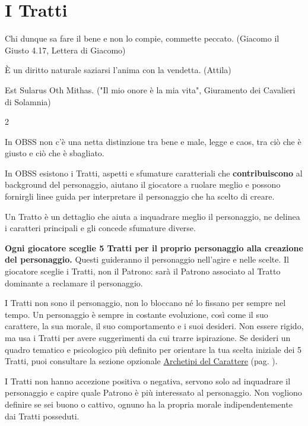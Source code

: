\section{I Tratti}\hypertarget{tratti}{}\label{tratti}

\begin{enfasi}{Chi dunque sa fare il bene e non lo compie, commette peccato. (Giacomo il Giusto 4.17, Lettera di Giacomo)
\smallskip

È un diritto naturale saziarsi l'anima con la vendetta. (Attila)
\smallskip

Est Sularus Oth Mithas. ("Il mio onore è la mia vita", Giuramento dei Cavalieri di Solamnia)
}\end{enfasi}

\begin{multicols}{2}

In OBSS non c'è una netta distinzione tra bene e male, legge e caos, tra ciò che è giusto e ciò che è sbagliato.

In OBSS esistono i Tratti, aspetti e sfumature caratteriali che \textbf{contribuiscono} al background del personaggio, aiutano il giocatore a ruolare meglio e possono fornirgli linee guida per interpretare il personaggio che ha scelto di creare.

Un Tratto è un dettaglio che aiuta a inquadrare meglio il personaggio, ne delinea i caratteri principali e gli concede sfumature diverse.

\textbf{Ogni giocatore sceglie 5 Tratti per il proprio personaggio alla creazione del personaggio.} Questi guideranno il personaggio nell'agire e nelle scelte. Il giocatore sceglie i Tratti, non il Patrono: sarà il Patrono associato al Tratto dominante a reclamare il personaggio.

\begin{giocatore}
I Tratti non sono il personaggio, non lo bloccano né lo fissano per sempre nel tempo. Un personaggio è sempre in costante evoluzione, così come il suo carattere, la sua morale, il suo comportamento e i suoi desideri. Non essere rigido, ma usa i Tratti per avere suggerimenti da cui trarre ispirazione. Se desideri un quadro tematico e psicologico più definito per orientare la tua scelta iniziale dei 5 Tratti, puoi consultare la sezione opzionale \hyperlink{archetipi}{Archetipi del Carattere} (pag. \pageref{archetipi}).
\end{giocatore}

I Tratti non hanno accezione positiva o negativa, servono solo ad inquadrare il personaggio e capire quale Patrono è più interessato al personaggio. Non vogliono definire se sei buono o cattivo, ognuno ha la propria morale indipendentemente dai Tratti posseduti.


\end{multicols}
